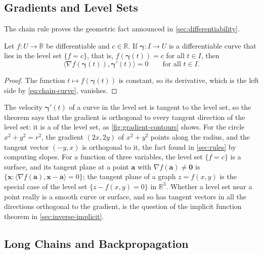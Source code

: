\subsection{Gradients and Level Sets}

The chain rule proves the geometric fact announced in \cref{sec:differentiability}.

\begin{theorem}
\label{thm:gradient-level}
Let $f\colon U\to\mathbb R$ be differentiable and $c\in\mathbb R$. If $\boldsymbol\gamma\colon I\to U$ is a differentiable curve that lies in the level set $\{f=c\}$, that is, $f(\boldsymbol\gamma(t))=c$ for all $t\in I$, then
\[
\bigl\langle\nabla f(\boldsymbol\gamma(t)),\boldsymbol\gamma'(t)\bigr\rangle=0\qquad\text{for all }t\in I .
\]
\end{theorem}

\begin{proof}
The function $t\mapsto f(\boldsymbol\gamma(t))$ is constant, so its derivative, which is the left side by \eqref{eq:chain-curve}, vanishes.
\end{proof}

The velocity $\boldsymbol\gamma'(t)$ of a curve in the level set is tangent to the level set, so the theorem says that the gradient is orthogonal to every tangent direction of the level set: it is a  of the level set, as \cref{fig:gradient-contours} shows. For the circle $x^2+y^2=r^2$, the gradient $(2x,2y)$ of $x^2+y^2$ points along the radius, and the tangent vector $(-y,x)$ is orthogonal to it, the fact found in \cref{sec:rules} by computing slopes. For a function of three variables, the level set $\{f=c\}$ is a surface, and its tangent plane at a point $\mathbf a$ with $\nabla f(\mathbf a)\ne\mathbf0$ is $\{\mathbf x: \langle\nabla f(\mathbf a),\mathbf x-\mathbf a\rangle=0\}$; the tangent plane of a graph $z=f(x,y)$ is the special case of the level set $\{z-f(x,y)=0\}$ in $\mathbb R^3$. Whether a level set near a point really is a smooth curve or surface, and so has tangent vectors in all the directions orthogonal to the gradient, is the question of the implicit function theorem in \cref{sec:inverse-implicit}.

\subsection{Long Chains and Backpropagation}

